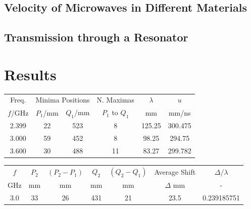\documentclass[12pt]{article}
\begin{document}
\subsection{Velocity of Microwaves in Different Materials}

\subsection{Transmission through a Resonator}

\section{Results}

\begin{center}
    \begin{tabular}{|c|c|c|c|c|c|}
    \hline
    Freq. & \multicolumn{2}{|c|}{Minima Positions} & N. Maximas &$\lambda$ & $u$ \\
    $f$/GHz & $P_1$/mm & $Q_1$/mm & $P_1$ to $Q_1$ & mm & mm/ns\\
    \hline 
    2.399	& 22	& 523	& 8	    & 125.25	& 300.475 \\
    3.000	& 59	& 452	& 8	    & 98.25	    & 294.75 \\
    3.600	& 30	& 488	& 11	& 83.27	    & 299.782 \\
    \hline
    \end{tabular}
\end{center}

\begin{center}
    \begin{tabular}{|c|c|c|c|c|c|c|}
    \hline
    $f$ & $P_2$ & $(P_2-P_1)$ & $Q_2$ & $(Q_2-Q_1)$ & Average Shift & $\Delta / \lambda$ \\
    GHz & mm & mm & mm & mm & $\Delta$ mm & - \\
    \hline 
    3.0 & 33 & 26 & 431 & 21 & 23.5 & 0.239185751 \\
    \hline
    \end{tabular}
\end{center}
\end{document}
